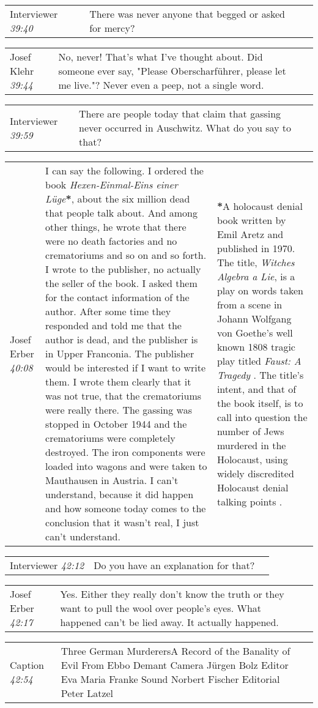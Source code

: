 \documentclass{article}
\newcommand{\I}{Interviewer}
\newcommand{\JE}{Josef Erber}
\newcommand{\JK}{Josef Klehr}
\newcommand{\dialogueentry}[4]{
    \begin{center}
    \begin{tabular}{p{1in} p{3.5in} p{1.5in}} 
        #2 \newline \textit{#1} & #3 & \small{#4} 
    \end{tabular}
    \end{center}
}
\newcommand{\seenote}[1]{\textbf{#1}}
\newcommand{\twolinebreak}{\newline \newline}
\newcommand{\titlepartone}{Three German Murderers}
\newcommand{\titleparttwo}{A Record of the Banality of Evil}
\begin{document}
\dialogueentry{39:40}{\I}{There was never anyone that begged or asked for mercy?}{}

\dialogueentry{39:44}{\JK}{No, never! That's what I've thought about. Did someone ever say, "Please Oberscharführer, please let me live."? Never even a peep, not a single word.}{}

\dialogueentry{39:59}{\I}{There are people today that claim that gassing never occurred in Auschwitz. What do you say to that?}{}

\dialogueentry{40:08}{\JE}{I can say the following. I ordered the book \textit{Hexen-Einmal-Eins einer Lüge}\seenote{*}, about the six million dead that people talk about. And among other things, he wrote that there were no death factories and no crematoriums and so on and so forth. I wrote to the publisher, no actually the seller of the book. I asked them for the contact information of the author. After some time they responded and told me that the author is dead, and the publisher is in Upper Franconia. The publisher would be interested if I want to write them. 
\twolinebreak
I wrote them clearly that it was not true, that the crematoriums were really there. The gassing was stopped in October 1944 and the crematoriums were completely destroyed. The iron components were loaded into wagons and were taken to Mauthausen in Austria. I can't understand, because it did happen and how someone today comes to the conclusion that it wasn't real, I just can't understand.}{\seenote{*}A holocaust denial book written by Emil Aretz and published in 1970. The title, \textit{Witches Algebra a Lie}, is a play on words taken from a scene in Johann Wolfgang von Goethe's well known 1808 tragic play titled \textit{Faust: A Tragedy} \cite{HexenEinmalEins}. The title's intent, and that of the book itself, is to call into question the number of Jews murdered in the Holocaust, using widely discredited Holocaust denial talking points \cite{HolocaustReferenzEmilAretz}.}

\dialogueentry{42:12}{\I}{Do you have an explanation for that?}{}

\dialogueentry{42:17}{\JE}{Yes. Either they really don't know the truth or they want to pull the wool over people's eyes. What happened can't be lied away. It actually happened.}{}

\dialogueentry{42:54}{Caption}{\titlepartone \space \titleparttwo
\twolinebreak
From Ebbo Demant
\twolinebreak
Camera Jürgen Bolz
\twolinebreak
Editor Eva Maria Franke
\twolinebreak
Sound Norbert Fischer
\twolinebreak
Editorial Peter Latzel}{}

\newpage

\printbibliography
\end{document}
